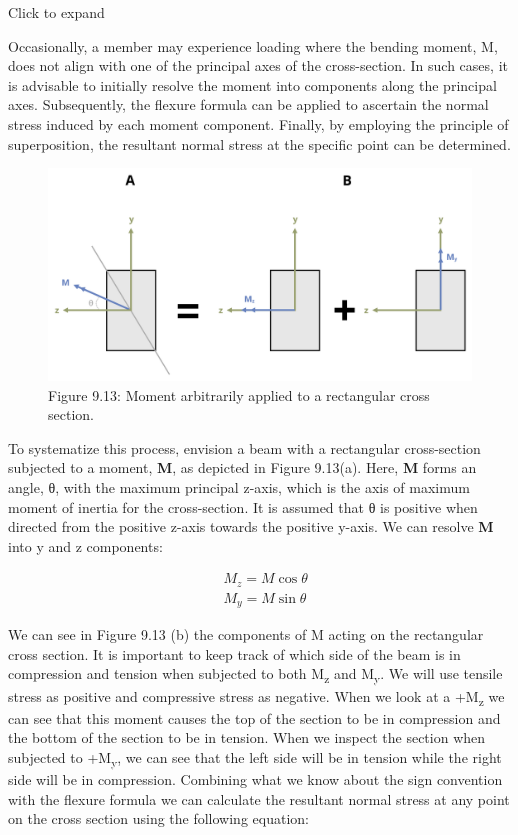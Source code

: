 \documentclass[
  letterpaper,
  DIV=11,
  numbers=noendperiod]{scrreprt}
\begin{document}
Click to expand

Occasionally, a member may experience loading where the bending moment,
M, does not align with one of the principal axes of the cross-section.
In such cases, it is advisable to initially resolve the moment into
components along the principal axes. Subsequently, the flexure formula
can be applied to ascertain the normal stress induced by each moment
component. Finally, by employing the principle of superposition, the
resultant normal stress at the specific point can be determined.

\begin{figure}[H]

{\centering \includegraphics{images/CH9 PNGs/Figure 9.13.png}

}

\caption{Figure 9.13: Moment arbitrarily applied to a rectangular cross
section.}

\end{figure}%

To systematize this process, envision a beam with a rectangular
cross-section subjected to a moment, \textbf{M}, as depicted in Figure
9.13(a). Here, \textbf{M} forms an angle, θ, with the maximum principal
z-axis, which is the axis of maximum moment of inertia for the
cross-section. It is assumed that θ is positive when directed from the
positive z-axis towards the positive y-axis. We can resolve \textbf{M}
into y and z components:

\[
\begin{aligned}
& M_z=M \cos \theta \\
& M_y=M \sin \theta
\end{aligned}
\]

We can see in Figure 9.13 (b) the components of M acting on the
rectangular cross section. It is important to keep track of which side
of the beam is in compression and tension when subjected to both
M\textsubscript{z} and M\textsubscript{y}. We will use tensile stress as
positive and compressive stress as negative. When we look at a
+M\textsubscript{z} we can see that this moment causes the top of the
section to be in compression and the bottom of the section to be in
tension. When we inspect the section when subjected to
+M\textsubscript{y}, we can see that the left side will be in tension
while the right side will be in compression. Combining what we know
about the sign convention with the flexure formula we can calculate the
resultant normal stress at any point on the cross section using the
following equation:
\end{document}
